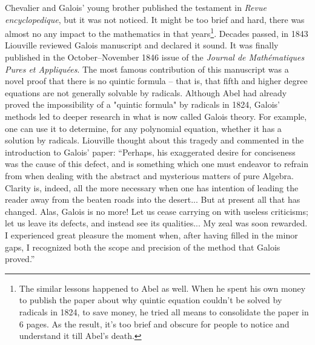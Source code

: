 \documentclass{article}
\begin{document}
Chevalier and Galois' young brother published the testament in {\em Revue encyclopedique}, but it was not noticed. It might be too brief and hard, there was almost no any impact to the mathematics in that years\footnote{The similar lessons happened to Abel as well. When he spent his own money to publish the paper about why quintic equation couldn't be solved by radicals in 1824, to save money, he tried all means to consolidate the paper in 6 pages. As the result, it's too brief and obscure for people to notice and understand it till Abel's death.}. Decades passed, in 1843 Liouville reviewed Galois manuscript and declared it sound. It was finally published in the October–November 1846 issue of the {\em Journal de Mathématiques Pures et Appliquées}. The most famous contribution of this manuscript was a novel proof that there is no quintic formula – that is, that fifth and higher degree equations are not generally solvable by radicals. Although Abel had already proved the impossibility of a "quintic formula" by radicals in 1824, Galois' methods led to deeper research in what is now called Galois theory. For example, one can use it to determine, for any polynomial equation, whether it has a solution by radicals. Liouville thought about this tragedy and commented in the introduction to Galois' paper: ``Perhaps, his exaggerated desire for conciseness was the cause of this defect, and is something which one must endeavor to refrain from when dealing with the abstract and mysterious matters of pure Algebra. Clarity is, indeed, all the more necessary when one has intention of leading the reader away from the beaten roads into the desert... But at present all that has changed. Alas, Galois is no more! Let us cease carrying on with useless criticisms; let us leave its defects, and instead see its qualities... My zeal was soon rewarded. I experienced great pleasure the moment when, after having filled in the minor gaps, I recognized both the scope and precision of the method that Galois proved.''\cite{Liouville-1846}
\end{document}
